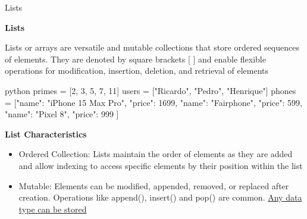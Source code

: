 \documentclass[
	11pt, 
]{beamer}
\begin{document}
\begin{frame}[fragile]{Lists}
\scriptsize
    
\begin{block}{\textbf{Lists}}
    
Lists or arrays are versatile and mutable collections that store ordered sequences of elements. They are denoted by square brackets [ ] and enable flexible operations for modification, insertion, deletion, and retrieval of elements

\end{block}
\begin{mintedbox}{python}
primes = [2, 3, 5, 7, 11]           
users = ["Ricardo", "Pedro", "Henrique"]
phones = [{"name": "iPhone 15 Max Pro", "price": 1699},
          {"name": "Fairphone", "price": 599},
          {"name": "Pixel 8", "price": 999}    ]  \end{mintedbox}

\begin{exampleblock}{\textbf{List Characteristics}}
    \begin{itemize}
        \item Ordered Collection: Lists maintain the order of elements as they are added and allow indexing to access specific elements by their position within the list
        \item Mutable: Elements can be modified, appended, removed, or replaced after creation. Operations like append(), insert() and pop() are common. \underline{Any data type can be stored}
    \end{itemize}    
\end{exampleblock}


\end{frame}



\end{document}

